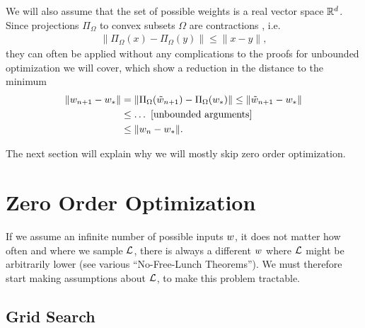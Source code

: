 We will also assume that the set of possible weights is a real
vector space \(\mathbb{R}^d\). Since projections \(\Pi_\Omega\) to convex
subsets \(\Omega\) are contractions \parencite[Lemma
3.1]{bubeckConvexOptimizationAlgorithms2015}, i.e.
\begin{align*}
	\| \Pi_\Omega(x) - \Pi_\Omega(y) \| \le \| x - y \|,
\end{align*}
they can often be applied without any complications to the proofs for unbounded
optimization we will cover, which show a reduction in the distance to the
minimum
\begin{align*}
	\|w_{n+1} - w_* \|
	&= \|\Pi_\Omega(\tilde{w}_{n+1}) - \Pi_\Omega(w_*)\|
	\le \|\tilde{w}_{n+1} - w_* \|\\
	&\le \dots \text{ [unbounded arguments] }\\
	&\le \|w_n - w_*\|.
\end{align*}

The next section will explain why we will mostly skip zero order
optimization.

\section{Zero Order Optimization}

If we assume an infinite number of possible inputs \(w\), it does not matter
how often and where we sample \(\mathcal{L}\), there is always a different \(w\) where
\(\mathcal{L}\) might be arbitrarily lower (see various ``No-Free-Lunch Theorems'').
We must therefore start making assumptions about \(\mathcal{L}\), to make this
problem tractable.

\subsection{Grid Search}

